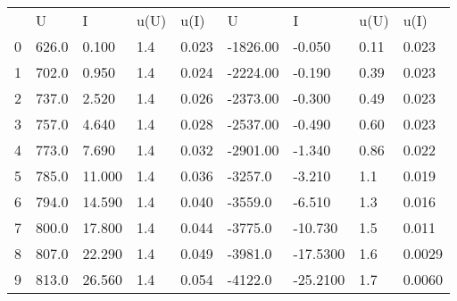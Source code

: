 \begin{tabular}{lllllllll}
 & U & I & u(U) & u(I) & U & I & u(U) & u(I) \\
0 & 626.0 & 0.100 & 1.4 & 0.023 & -1826.00 & -0.050 & 0.11 & 0.023 \\
1 & 702.0 & 0.950 & 1.4 & 0.024 & -2224.00 & -0.190 & 0.39 & 0.023 \\
2 & 737.0 & 2.520 & 1.4 & 0.026 & -2373.00 & -0.300 & 0.49 & 0.023 \\
3 & 757.0 & 4.640 & 1.4 & 0.028 & -2537.00 & -0.490 & 0.60 & 0.023 \\
4 & 773.0 & 7.690 & 1.4 & 0.032 & -2901.00 & -1.340 & 0.86 & 0.022 \\
5 & 785.0 & 11.000 & 1.4 & 0.036 & -3257.0 & -3.210 & 1.1 & 0.019 \\
6 & 794.0 & 14.590 & 1.4 & 0.040 & -3559.0 & -6.510 & 1.3 & 0.016 \\
7 & 800.0 & 17.800 & 1.4 & 0.044 & -3775.0 & -10.730 & 1.5 & 0.011 \\
8 & 807.0 & 22.290 & 1.4 & 0.049 & -3981.0 & -17.5300 & 1.6 & 0.0029 \\
9 & 813.0 & 26.560 & 1.4 & 0.054 & -4122.0 & -25.2100 & 1.7 & 0.0060 \\
\end{tabular}

